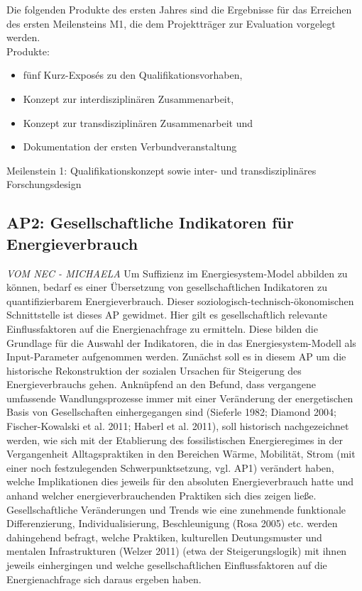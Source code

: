 \documentclass[a4paper,11pt,twoside]{scrartcl}
\begin{document}
Die folgenden Produkte des ersten Jahres sind die Ergebnisse für das Erreichen des ersten Meilensteins M1, die dem Projektträger zur Evaluation vorgelegt werden.\\
Produkte:
\begin{itemize}
    \item fünf Kurz-Exposés zu den Qualifikationsvorhaben, 
    \item Konzept zur interdisziplinären Zusammenarbeit,
    \item Konzept zur transdisziplinären Zusammenarbeit und
    \item Dokumentation der ersten Verbundveranstaltung 
\end{itemize}
Meilenstein 1: Qualifikationskonzept sowie inter- und transdisziplinäres Forschungsdesign

\subsection*{AP2: Gesellschaftliche Indikatoren für Energieverbrauch}
\textit{VOM NEC - MICHAELA}
Um Suffizienz im Energiesystem-Model abbilden zu können, bedarf es einer Übersetzung von gesellschaftlichen Indikatoren zu quantifizierbarem Energieverbrauch. Dieser soziologisch-technisch-ökonomischen Schnittstelle ist dieses AP gewidmet. Hier gilt es gesellschaftlich relevante Einflussfaktoren auf die Energienachfrage zu ermitteln. Diese bilden die Grundlage für die Auswahl der Indikatoren, die in das Energiesystem-Modell als Input-Parameter aufgenommen werden. Zunächst soll es in diesem AP um die historische Rekonstruktion der sozialen Ursachen für Steigerung des Energieverbrauchs gehen. Anknüpfend an den Befund, dass vergangene umfassende Wandlungsprozesse immer mit einer Veränderung der energetischen Basis von Gesellschaften einhergegangen sind (Sieferle 1982; Diamond 2004; Fischer-Kowalski et al. 2011; Haberl et al. 2011), soll historisch nachgezeichnet werden, wie sich mit der Etablierung des fossilistischen Energieregimes in der Vergangenheit Alltagspraktiken in den Bereichen Wärme, Mobilität, Strom (mit einer noch festzulegenden Schwerpunktsetzung, vgl. AP1) verändert haben, welche Implikationen dies jeweils für den absoluten Energieverbrauch hatte und anhand welcher energieverbrauchenden Praktiken sich dies zeigen ließe. Gesellschaftliche Veränderungen und Trends wie eine zunehmende funktionale Differenzierung, Individualisierung, Beschleunigung (Rosa 2005) etc. werden dahingehend befragt, welche Praktiken, kulturellen Deutungsmuster und mentalen Infrastrukturen (Welzer 2011) (etwa der Steigerungslogik) mit ihnen jeweils einhergingen und welche gesellschaftlichen Einflussfaktoren auf die Energienachfrage sich daraus ergeben haben.
\end{document}
